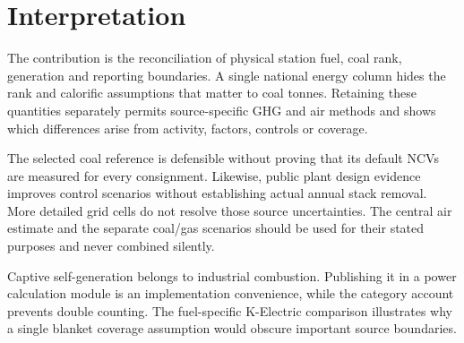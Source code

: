 \section{Interpretation}
\label{sec:discussion}
The contribution is the reconciliation of physical station fuel, coal rank, generation and reporting boundaries. A single national energy column hides the rank and calorific assumptions that matter to coal tonnes. Retaining these quantities separately permits source-specific GHG and air methods and shows which differences arise from activity, factors, controls or coverage.

The selected coal reference is defensible without proving that its default NCVs are measured for every consignment. Likewise, public plant design evidence improves control scenarios without establishing actual annual stack removal. More detailed grid cells do not resolve those source uncertainties. The central air estimate and the separate coal/gas scenarios should be used for their stated purposes and never combined silently.

Captive self-generation belongs to industrial combustion. Publishing it in a power calculation module is an implementation convenience, while the category account prevents double counting. The fuel-specific K-Electric comparison illustrates why a single blanket coverage assumption would obscure important source boundaries.
